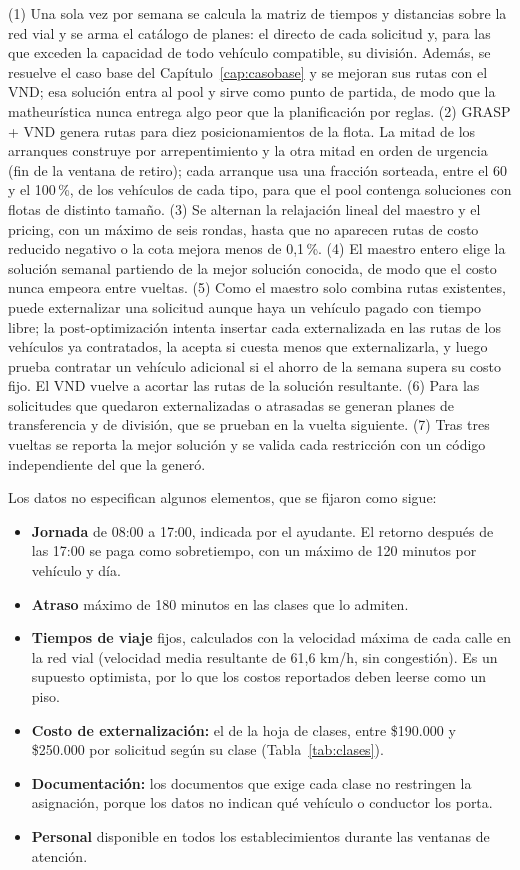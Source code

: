  (1) Una sola vez por semana se calcula la matriz de tiempos y distancias sobre la red vial y se arma el catálogo de planes: el directo de cada solicitud y, para las que exceden la capacidad de todo vehículo compatible, su división. Además, se resuelve el caso base del Capítulo~\ref{cap:casobase} y se mejoran sus rutas con el VND; esa solución entra al pool y sirve como punto de partida, de modo que la matheurística nunca entrega algo peor que la planificación por reglas. (2) GRASP + VND genera rutas para diez posicionamientos de la flota. La mitad de los arranques construye por arrepentimiento y la otra mitad en orden de urgencia (fin de la ventana de retiro); cada arranque usa una fracción sorteada, entre el 60 y el 100\,\%, de los vehículos de cada tipo, para que el pool contenga soluciones con flotas de distinto tamaño. (3) Se alternan la relajación lineal del maestro y el pricing, con un máximo de seis rondas, hasta que no aparecen rutas de costo reducido negativo o la cota mejora menos de 0,1\,\%. (4) El maestro entero elige la solución semanal partiendo de la mejor solución conocida, de modo que el costo nunca empeora entre vueltas. (5) Como el maestro solo combina rutas existentes, puede externalizar una solicitud aunque haya un vehículo pagado con tiempo libre; la post-optimización intenta insertar cada externalizada en las rutas de los vehículos ya contratados, la acepta si cuesta menos que externalizarla, y luego prueba contratar un vehículo adicional si el ahorro de la semana supera su costo fijo. El VND vuelve a acortar las rutas de la solución resultante. (6) Para las solicitudes que quedaron externalizadas o atrasadas se generan planes de transferencia y de división, que se prueban en la vuelta siguiente. (7) Tras tres vueltas se reporta la mejor solución y se valida cada restricción con un código independiente del que la generó.

 Los datos no especifican algunos elementos, que se fijaron como sigue:
\begin{itemize}\itemsep0pt
\item \textbf{Jornada} de 08:00 a 17:00, indicada por el ayudante. El retorno después de las 17:00 se paga como sobretiempo, con un máximo de 120 minutos por vehículo y día.
\item \textbf{Atraso} máximo de 180 minutos en las clases que lo admiten.
\item \textbf{Tiempos de viaje} fijos, calculados con la velocidad máxima de cada calle en la red vial (velocidad media resultante de 61,6 km/h, sin congestión). Es un supuesto optimista, por lo que los costos reportados deben leerse como un piso.
\item \textbf{Costo de externalización:} el de la hoja de clases, entre \$190.000 y \$250.000 por solicitud según su clase (Tabla~\ref{tab:clases}).
\item \textbf{Documentación:} los documentos que exige cada clase no restringen la asignación, porque los datos no indican qué vehículo o conductor los porta.
\item \textbf{Personal} disponible en todos los establecimientos durante las ventanas de atención.
\end{itemize}
